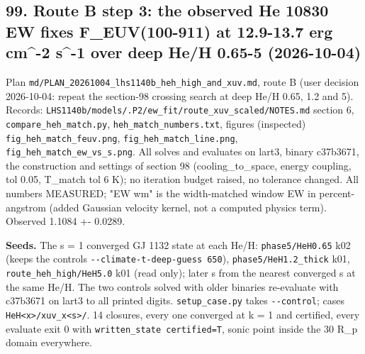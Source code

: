 \documentclass[english,a4paper]{my_memo}
\begin{document}
\subsection{99. Route B step 3: the observed He 10830 EW fixes F\_EUV(100-911) at 12.9-13.7 erg cm\^{}-2 s\^{}-1 over deep He/H 0.65-5 (2026-10-04)}\label{99-route-b-step-3-the-observed-he-10830-ew-fixes-f_euv100-911-at-129-137-erg-cm-2-s-1-over-deep-heh-065-5-2026-10-04}

Plan \texttt{md/PLAN\_20261004\_lhs1140b\_heh\_high\_and\_xuv.md}, route B (user
decision 2026-10-04: repeat the section-98 crossing search at deep He/H
0.65, 1.2 and 5). Records:
\texttt{LHS1140b/models/.P2/ew\_fit/route\_xuv\_scaled/NOTES.md} section 6,
\texttt{compare\_heh\_match.py}, \texttt{heh\_match\_numbers.txt}, figures (inspected)
\texttt{fig\_heh\_match\_feuv.png}, \texttt{fig\_heh\_match\_line.png},
\texttt{fig\_heh\_match\_ew\_vs\_s.png}. All solves and evaluates on lart3, binary
c37b3671, the construction and settings of section 98 (cooling\_to\_space,
energy coupling, tol 0.05, T\_match tol 6 K); no iteration budget raised, no
tolerance changed. All numbers MEASURED; "EW wm" is the width-matched
window EW in percent-angstrom (added Gaussian velocity kernel, not a
computed physics term). Observed 1.1084 +- 0.0289.

\textbf{Seeds.} The s = 1 converged GJ 1132 state at each He/H:
\texttt{phase5/HeH0.65} k02 (keeps the control\textquotesingle s \texttt{-\/-climate-t-deep-guess\ 650}),
\texttt{phase5/HeH1.2\_thick} k01, \texttt{route\_heh\_high/HeH5.0} k01 (read only); later s
from the nearest converged s at the same He/H. The two controls solved with
older binaries re-evaluate with c37b3671 on lart3 to all printed digits.
\texttt{setup\_case.py} takes \texttt{-\/-control}; cases \texttt{HeH\textless{}x\textgreater{}/xuv\_x\textless{}s\textgreater{}/}. 14 closures,
every one converged at k = 1 and certified, every evaluate exit 0 with
\texttt{written\_state\ certified=T}, sonic point inside the 30 R\_p domain
everywhere.
\end{document}
